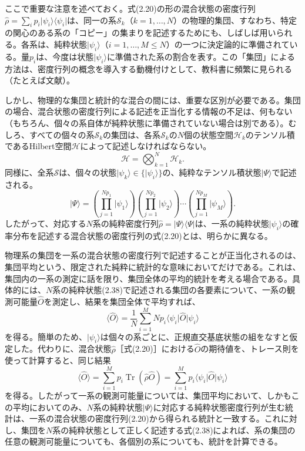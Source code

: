 \hypertarget{srcpage:43}{}\label{srcpage:43}
ここで重要な注意を述べておく。式(2.20)の形の混合状態の密度行列$\hat\rho=\sum_i p_i\lvert\psi_i\rangle\langle\psi_i\rvert$は、同一の系$\mathcal S_k$（$k=1,\ldots,N$）の物理的集団、すなわち、特定の関心のある系の「コピー」の集まりを記述するためにも、しばしば用いられる。各系は、純粋状態$\lvert\psi_i\rangle$（$i=1,\ldots,M\le N$）の一つに決定論的に準備されている。量$p_i$は、今度は状態$\lvert\psi_i\rangle$に準備された系の割合を表す。この「集団」による方法は、密度行列の概念を導入する動機付けとして、教科書に頻繁に見られる（たとえば文献\cite{ref058}）。

しかし、物理的な集団と統計的な混合の間には、重要な区別が必要である。集団の場合、混合状態の密度行列による記述を正当化する情報の不足は、何もない（もちろん、個々の系自体が純粋状態に準備されていない場合は別である）。むしろ、すべての個々の系$\mathcal S_k$の集団は、各系$\mathcal S_k$の$N$個の状態空間$\mathcal H_k$のテンソル積であるHilbert空間$\mathcal H$によって記述しなければならない。
\begin{equation}\mathcal H=\bigotimes_{k=1}^N\mathcal H_k.\tag{2.37}\end{equation}
同様に、全系$\mathcal S$は、個々の状態$\lvert\psi_k\rangle\in\{\lvert\psi_i\rangle\}$の、純粋なテンソル積状態$\lvert\Psi\rangle$で記述される。
\begin{equation}\lvert\Psi\rangle=\left(\prod_{j=1}^{Np_1}\lvert\psi_1\rangle\right)\left(\prod_{j=1}^{Np_2}\lvert\psi_2\rangle\right)\cdots\left(\prod_{j=1}^{Np_M}\lvert\psi_M\rangle\right).\tag{2.38}\end{equation}
したがって、対応する$N$系の純粋密度行列$\hat\rho=\lvert\Psi\rangle\langle\Psi\rvert$は、一系の純粋状態$\lvert\psi_i\rangle$の確率分布を記述する混合状態の密度行列の式(2.20)とは、明らかに異なる。

物理系の集団を一系の混合状態の密度行列で記述することが正当化されるのは、集団平均という、限定された純粋に統計的な意味においてだけである。これは、集団内の一系の測定に話を限り、集団全体の平均的統計を考える場合である。具体的には、$N$系の純粋状態(2.38)で記述される集団の各要素について、一系の観測可能量$\hat O$を測定し、結果を集団全体で平均すれば、
\begin{equation}\langle\hat O\rangle=\frac1N\sum_{i=1}^M Np_i\langle\psi_i\rvert\hat O\lvert\psi_i\rangle\tag{2.39}\end{equation}
を得る。簡単のため、$\lvert\psi_i\rangle$は個々の系ごとに、正規直交基底状態の組をなすと仮定した。代わりに、混合状態$\hat\rho$［式(2.20)］における$\hat O$の期待値を、トレース則を使って計算すると、同じ結果
\hypertarget{srcpage:44}{}\label{srcpage:44}
\begin{equation}\langle\hat O\rangle=\sum_{i=1}^M p_i\operatorname{Tr}(\hat\rho\hat O)=\sum_{i=1}^M p_i\langle\psi_i\rvert\hat O\lvert\psi_i\rangle\tag{2.40}\end{equation}
を得る。したがって一系の観測可能量については、集団平均において、しかもこの平均においてのみ、$N$系の純粋状態$\lvert\Psi\rangle$に対応する純粋状態密度行列が生む統計は、一系の混合状態の密度行列(2.20)から得られる統計と一致する。これに対し、集団を$N$系の純粋状態として正しく記述する式(2.38)によれば、系の集団の任意の観測可能量についても、各個別の系についても、統計を計算できる。
